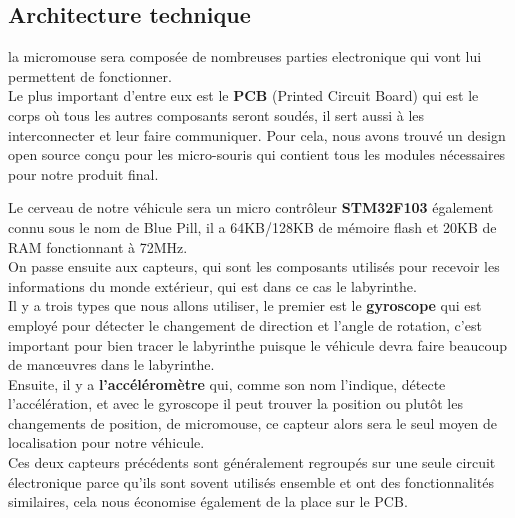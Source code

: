 \subsection{Architecture technique} \label{sec:archTechnique}

   la micromouse sera composée de nombreuses parties electronique qui vont lui
permettent de fonctionner. \\


   Le plus important d'entre eux est le \textbf{PCB} (Printed Circuit Board)
qui est le corps où tous les autres composants seront soudés, il sert aussi
à les interconnecter et  leur faire communiquer. Pour cela, nous avons
trouvé un design open source \cite{Bulebule:1} conçu pour les micro-souris
qui contient tous les modules nécessaires pour notre produit final. \\




   Le cerveau de notre véhicule sera un micro contrôleur \textbf{STM32F103}
\cite{Bluepill:1} également connu sous le nom de Blue Pill, il a 64KB/128KB de
mémoire flash et 20KB de RAM fonctionnant à 72MHz. \\


   On passe ensuite aux capteurs, qui sont les composants utilisés pour
recevoir les informations du monde extérieur, qui est dans ce cas le
labyrinthe. \\


   Il y a trois types que nous allons utiliser, le premier est le
\textbf{gyroscope} qui est employé pour détecter le changement de direction
et l'angle de rotation, c'est important pour bien tracer le labyrinthe
puisque le véhicule devra faire beaucoup de manœuvres dans le labyrinthe. \\


   Ensuite, il y a \textbf{l'accéléromètre} qui, comme son nom l'indique,
détecte l'accélération, et avec le gyroscope il peut trouver la position ou
plutôt les changements de position, de micromouse, ce capteur alors sera le
seul moyen de localisation pour notre véhicule.\\


   Ces deux capteurs précédents sont généralement regroupés sur une seule
circuit électronique parce qu'ils sont sovent utilisés ensemble et ont des
fonctionnalités similaires, cela nous économise également de la place sur le
PCB. \\


